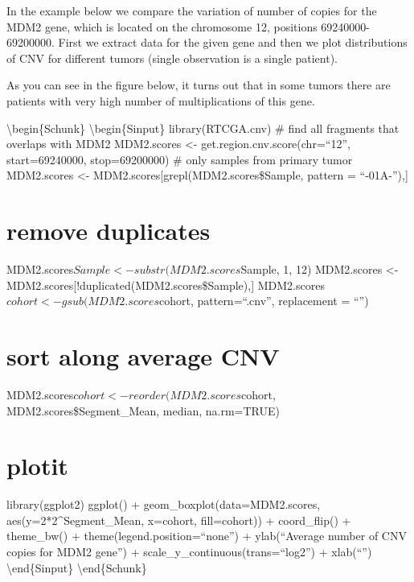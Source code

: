 In the example below we compare the variation of number of copies for
the MDM2 gene, which is located on the chromosome 12, positions
69240000-69200000. First we extract data for the given gene and then we
plot distributions of CNV for different tumors (single observation is a
single patient).

As you can see in the figure below, it turns out that in some tumors
there are patients with very high number of multiplications of this
gene.

\textbackslash{}begin\{Schunk\} \textbackslash{}begin\{Sinput\}
library(RTCGA.cnv) \# find all fragments that overlaps with MDM2
MDM2.scores \textless{}- get.region.cnv.score(chr=``12'',
start=69240000, stop=69200000) \# only samples from primary tumor
MDM2.scores \textless{}- MDM2.scores{[}grepl(MDM2.scores\$Sample,
pattern = ``-01A-''),{]}

\section{remove duplicates}\label{remove-duplicates}

MDM2.scores\(Sample <- substr(MDM2.scores\)Sample, 1, 12) MDM2.scores
\textless{}- MDM2.scores{[}!duplicated(MDM2.scores\$Sample),{]}
MDM2.scores\(cohort <- gsub(MDM2.scores\)cohort, pattern=``.cnv'',
replacement = ``'')

\section{sort along average CNV}\label{sort-along-average-cnv}

MDM2.scores\(cohort <- reorder(MDM2.scores\)cohort,
MDM2.scores\$Segment\_Mean, median, na.rm=TRUE)

\section{plotit}\label{plotit}

library(ggplot2) ggplot() + geom\_boxplot(data=MDM2.scores,
aes(y=2*2\^{}Segment\_Mean, x=cohort, fill=cohort)) + coord\_flip() +
theme\_bw() + theme(legend.position=``none'') + ylab(``Average number of
CNV copies for MDM2 gene'') + scale\_y\_continuous(trans=``log2'') +
xlab(``'') \textbackslash{}end\{Sinput\} \textbackslash{}end\{Schunk\}

